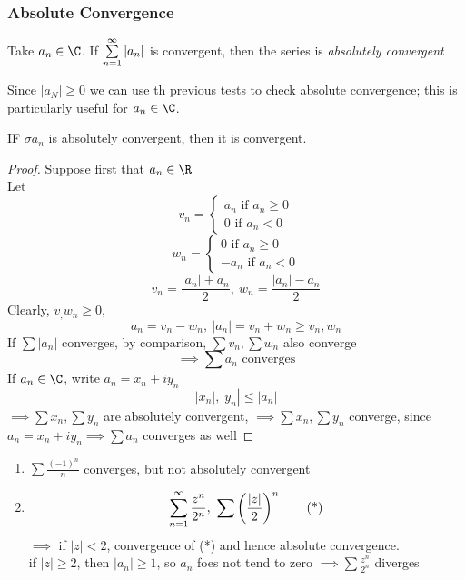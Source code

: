 \subsubsection{Absolute Convergence}
\begin{definition}
Take $a_n \in \C$. If $\s[n]{\infty}|a_n|$ is convergent, then the series is \emph{absolutely convergent}
\end{definition}
\begin{note}
Since $|a_N| \geq 0$ we can use th previous tests to check absolute convergence; this is particularly useful for $a_n \in \C$.
\end{note}
\begin{theorem}
IF $\sigma a_n$ is absolutely convergent, then it is convergent.
\begin{proof}
Suppose first that $a_n \in \R$\\
Let
\[v_n = \begin{cases}a_n \text{ if }a_n \geq 0\\0 \text{ if }a_n < 0\end{cases}\]
\[w_n = \begin{cases}0 \text{ if }a_n \geq 0\\-a_n \text{ if }a_n < 0\end{cases}\]
\[v_n = \frac{|a_n| + a_n}{2}, \ w_n = \frac{|a_n| - a_n}{2}\]
Clearly, $v_,w_n \geq 0$,
\[a_n = v_n - w_n, \ |a_n| = v_n + w_n \geq v_n,w_n\]
If $\sum |a_n|$ converges, by comparison, $\sum v_n, \sum  w_n$ also converge
\[\implies \sum a_n\text{ converges}\]
If $a_n\in\C$, write $a_n = x_n + iy_n$
\[|x_n|,|y_n| \leq |a_n|\]
$\implies \sum x_n, \sum y_n$ are absolutely convergent, $\implies \sum x_n, \sum y_n$ converge, since $a_n = x_n + iy_n \implies \sum a_n$ converges as well
\end{proof}
\end{theorem}
\begin{example}
\hfill{ }
\begin{enumerate}
    \item $\sum \frac{(-1)^n}{n}$ converges, but not absolutely convergent
    \item \[\s[n]{\infty}\frac{z^n}{2^n}, \ \sum\left(\frac{|z|}{2}\right)^n \tag{*}\]
    $\implies$ if $|z|<2$, convergence of (*) and hence absolute convergence.\\
    if $|z|\geq 2$, then $|a_n| \geq 1$, so $a_n$ foes not tend to zero $\implies \sum \frac{z^n}{2^n}$ diverges
\end{enumerate}
\end{example}
